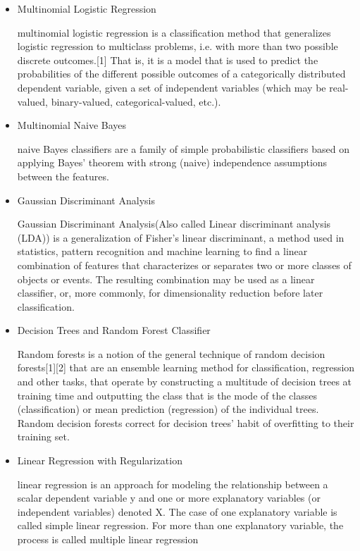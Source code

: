 \documentclass{article}
\begin{document}
\begin{itemize}

\item Multinomial Logistic Regression

multinomial logistic regression is a classification method that generalizes logistic regression to multiclass problems, i.e. with more than two possible discrete outcomes.[1] That is, it is a model that is used to predict the probabilities of the different possible outcomes of a categorically distributed dependent variable, given a set of independent variables (which may be real-valued, binary-valued, categorical-valued, etc.).

\item Multinomial Naive Bayes

naive Bayes classifiers are a family of simple probabilistic classifiers based on applying Bayes' theorem with strong (naive) independence assumptions between the features.

\item Gaussian Discriminant Analysis

Gaussian Discriminant Analysis(Also called Linear discriminant analysis (LDA)) is a generalization of Fisher's linear discriminant, a method used in statistics, pattern recognition and machine learning to find a linear combination of features that characterizes or separates two or more classes of objects or events. The resulting combination may be used as a linear classifier, or, more commonly, for dimensionality reduction before later classification.

\item Decision Trees and Random Forest Classifier

Random forests is a notion of the general technique of random decision forests[1][2] that are an ensemble learning method for classification, regression and other tasks, that operate by constructing a multitude of decision trees at training time and outputting the class that is the mode of the classes (classification) or mean prediction (regression) of the individual trees. Random decision forests correct for decision trees' habit of overfitting to their training set.

\item Linear Regression with Regularization

linear regression is an approach for modeling the relationship between a scalar dependent variable y and one or more explanatory variables (or independent variables) denoted X. The case of one explanatory variable is called simple linear regression. For more than one explanatory variable, the process is called multiple linear regression


\end{itemize}
\end{document}
